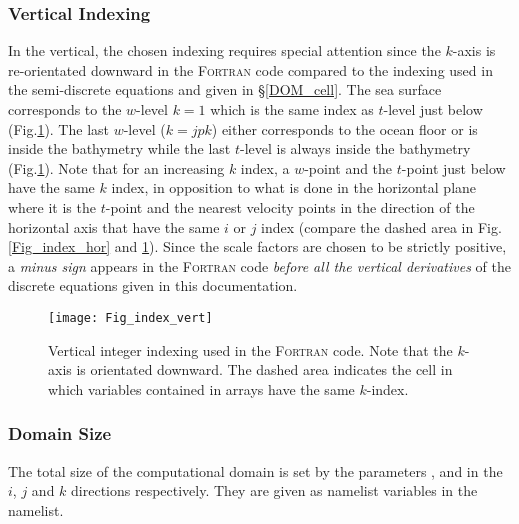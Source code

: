 \documentclass[NEMO_book]{subfiles}
\begin{document}
\subsubsection{Vertical Indexing}
\label{DOM_Num_Index_vertical}

In the vertical, the chosen indexing requires special attention since the 
$k$-axis is re-orientated downward in the \textsc{Fortran} code compared 
to the indexing used in the semi-discrete equations and given in \S\ref{DOM_cell}. 
The sea surface corresponds to the $w$-level $k=1$ which is the same index 
as $t$-level just below (Fig.\ref{Fig_index_vert}). The last $w$-level ($k=jpk$) 
either corresponds to the ocean floor or is inside the bathymetry while the last 
$t$-level is always inside the bathymetry (Fig.\ref{Fig_index_vert}). Note that 
for an increasing $k$ index, a $w$-point and the $t$-point just below have the 
same $k$ index, in opposition to what is done in the horizontal plane where 
it is the $t$-point and the nearest velocity points in the direction of the horizontal 
axis that have the same $i$ or $j$ index (compare the dashed area in 
Fig.\ref{Fig_index_hor} and \ref{Fig_index_vert}). Since the scale factors are 
chosen to be strictly positive, a \emph{minus sign} appears in the \textsc{Fortran} 
code \emph{before all the vertical derivatives} of the discrete equations given in 
this documentation.

\begin{figure}[!pt]    \begin{center}
\texttt{[image: Fig\_index\_vert]}
\caption{ \label{Fig_index_vert}     
Vertical integer indexing used in the \textsc{Fortran } code. Note that 
the $k$-axis is orientated downward. The dashed area indicates the cell in 
which variables contained in arrays have the same $k$-index.}
\end{center}   \end{figure}

\subsubsection{Domain Size}
\label{DOM_size}

The total size of the computational domain is set by the parameters , 
 and  in the $i$, $j$ and $k$ directions respectively. They are 
given as namelist variables in the  namelist. 
\end{document}
